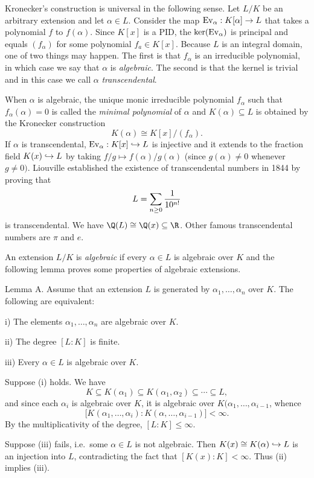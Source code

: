Kronecker's construction is universal in the following sense. Let $L/K$ be an arbitrary extension and let $\alpha\in L$. Consider the map $\mathop {\rm Ev}_\alpha : K[\alpha] \to L$ that takes a polynomial $f$ to $f(\alpha)$. Since $K[x]$ is a PID, the $\ker(\mathop {\rm Ev}_\alpha)$ is principal and equals $(f_\alpha)$ for some polynomial $f_a\in K[x]$. Because $L$ is an integral domain, one of two things may happen. The first is that $f_\alpha$ is an irreducible polynomial, in which case we say that $\alpha$ is {\it algebraic}. The second is that the kernel is trivial and in this case we call $\alpha$ {\it transcendental}.

When $\alpha$ is algebraic, the unique monic irreducible polynomial $f_\alpha$ such that $f_\alpha(\alpha) = 0$ is called the {\it minimal polynomial} of $\alpha$ and $K(\alpha) \subseteq L$ is obtained by the Kronecker construction
$$K(\alpha)\cong K[x]/(f_\alpha).$$
If $\alpha$ is transcendental, $\mathop {\rm Ev}_\alpha : K[x] \hookrightarrow L$ is injective and it extends to the fraction field $K(x) \hookrightarrow L$ by taking $f/g \mapsto f(\alpha)/g(\alpha)$ (since $g(\alpha) \neq 0$ whenever $g\neq 0)$. Liouville established the existence of transcendental numbers in 1844 by proving that
$$L = \sum_{n\geq 0} {1\over 10^{n!}}$$
is transcendental. We have $\Q(L)\cong \Q(x) \subseteq \R$. Other famous transcendental numbers are $\pi$ and $e$.

An extension $L/K$ is {\it algebraic} if every $\alpha\in L$ is algebraic over $K$ and the following lemma proves some properties of algebraic extensions.

\proclaim Lemma A. Assume that an extension $L$ is generated by $\alpha_1,\ldots,\alpha_n$ over $K$. The following are equivalent:
\medskip
\item{i)} The elements $\alpha_1,\ldots,\alpha_n$ are algebraic over $K$.
\smallskip
\item{ii)} The degree $[L:K]$ is finite.
\smallskip
\item{iii)} Every $\alpha\in L$ is algebraic over $K$.
\medskip

\proof Suppose (i) holds. We have
$$K \subseteq K(\alpha_1)\subseteq K(\alpha_1, \alpha_2) \subseteq \cdots \subseteq L,$$
and since each $\alpha_i$ is algebraic over $K$, it is algebraic over $K(\alpha_1,\ldots,\alpha_{i-1}$, whence
$$\big[ K(\alpha_1,\ldots,\alpha_i) : K(\alpha,\ldots,\alpha_{i-1})\big] < \infty.$$
By the multiplicativity of the degree, $[L:K] \leq \infty$.

Suppose (iii) fails, i.e.\ some $\alpha\in L$ is not algebraic. Then $K(x) \cong K(\alpha) \hookrightarrow L$ is an injection into $L$, contradicting the fact that $[K(x) : K] < \infty$. Thus (ii) implies (iii).

